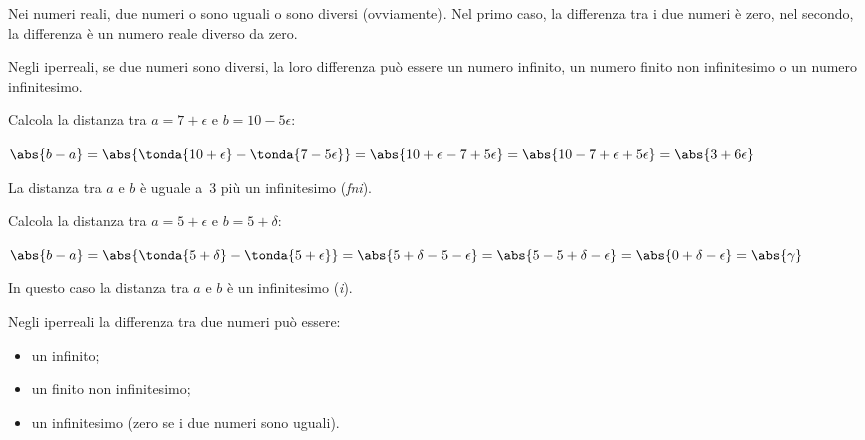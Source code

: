 
Nei numeri reali, due numeri o sono uguali o sono diversi (ovviamente).
Nel primo caso, la differenza tra i due numeri è zero, 
nel secondo, la differenza è un numero reale diverso da zero.

Negli iperreali, se due numeri sono diversi, la loro differenza può 
essere un numero infinito, un numero finito non infinitesimo o un numero 
infinitesimo.

\begin{esempio}
 Calcola la distanza tra \(a=7+\epsilon\) e \(b=10-5\epsilon\):
 
 \(\abs{b-a}=\abs{\tonda{10+\epsilon} - \tonda{7-5\epsilon}}=
   \abs{10+\epsilon - 7+5\epsilon}=
   \abs{10-7 + \epsilon+5\epsilon}=
   \abs{3 + 6\epsilon}
 \)
 
La distanza tra \(a\) e \(b\) è uguale a~3 più un infinitesimo 
(\emph{fni}).
\end{esempio}

\begin{esempio}
 Calcola la distanza tra \(a=5+\epsilon\) e \(b=5+\delta\):
 
 \(\abs{b-a}=\abs{\tonda{5+\delta} - \tonda{5+\epsilon}}=
   \abs{5+\delta - 5-\epsilon}=
   \abs{5-5 + \delta - \epsilon}=
   \abs{0 + \delta - \epsilon} = \abs{\gamma}
 \)

In questo caso la distanza tra \(a\) e \(b\) è un infinitesimo 
(\emph{i}).
\end{esempio}

\pagebreak %

\noindent Negli iperreali la differenza tra due numeri può essere:
\begin{itemize} [noitemsep]
 \item un infinito;
 \item un finito non infinitesimo;
 \item un infinitesimo (zero se i due numeri sono uguali).
\end{itemize}

% 

